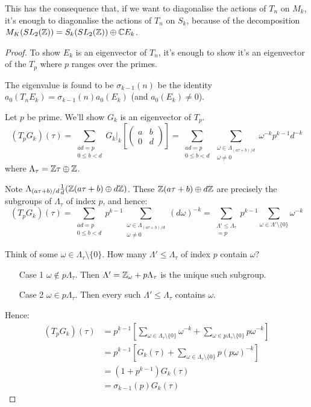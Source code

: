 \documentclass[10pt,a4paper]{article}
\begin{document}
This has the consequence that, if we want to diagonalise the actions of $T_n$ on $M_k$, it's enough to diagonalise the actions of $T_n$ on $S_k$, because of the decomposition $M_K(SL_2(\mathbb{Z})) = S_k(SL_2(\mathbb{Z})) \oplus \mathbb{C} E_k$.
\begin{proof}
  To show $E_k$ is an eigenvector of $T_n$, it's enough to show it's an eigenvector of the $T_p$ where $p$ ranges over the primes.

  The eigenvalue is found to be $\sigma_{k-1}(n)$ be the identity $a_0(T_n E_k) = \sigma_{k-1}(n)a_0(E_k)$ (and $a_0(E_k) \neq 0$).

  Let $p$ be prime. We'll show $G_k$ is an eigenvector of $T_p$.
  \[(T_pG_k)(\tau) = \sum_{\substack{ad = p\\ 0\leq b < d}} G_k|_k\left[\begin{pmatrix}a&b\\0&d\end{pmatrix}\right] = \sum_{\substack{ad = p\\ 0\leq b < d}}\sum_{\substack{\omega \in \Lambda_{(a\tau+b)/d}\\ \omega \neq 0}}\omega^{-k}p^{k-1}d^{-k}\]
  where $\Lambda_\tau = \mathbb{Z}\tau \oplus \mathbb{Z}$.

  Note $\Lambda_{(a\tau+b)/d} \frac{1}{d}(\mathbb{Z}(a\tau+b)\oplus d\mathbb{Z})$. These $\mathbb{Z}(a\tau+b)\oplus d\mathbb{Z}$ are precisely the subgroups of $\Lambda_\tau$ of index $p$, and hence:
  \[(T_p G_k)(\tau) = \sum_{\substack{ad = p\\ 0\leq b < d}} p^{k-1} \sum_{\substack{\omega \in \Lambda_{(a\tau+b)/d}\\\omega \neq 0}} (d\omega)^{-k} = \sum_{\substack{\Lambda' \leq \Lambda_\tau \\ [\Lambda_\tau:\Lambda']=p }} p^{k-1} \sum_{\omega \in \Lambda'\setminus\{0\}} \omega^{-k}\]

  Think of some $\omega \in \Lambda_\tau \setminus \{0\}$. How many $\Lambda' \leq \Lambda_\tau$ of index $p$ contain $\omega$?
  \begin{enumerate}
    \item[Case 1] $\omega \notin p\Lambda_\tau$. Then $\Lambda' = \mathbb{Z}_\omega +p\Lambda_\tau$ is the unique such subgroup.
    \item[Case 2] $\omega \in p\Lambda_\tau$. Then every such $\Lambda'\leq \Lambda_\tau$ contains $\omega$.
  \end{enumerate}
  Hence:
  \begin{align*}
    (T_pG_k)(\tau) &= p^{k-1}\left[\sum_{\omega \in \Lambda_\tau\setminus\{0\}} \omega^{-k} + \sum_{\omega \in p\Lambda_\tau \setminus\{0\}} p\omega^{-k} \right] \\
    &= p^{k-1}\left[G_k(\tau) + \sum_{\omega \in \Lambda_\tau \setminus\{0\}} p(p\omega)^{-k}\right]\\
    &= (1+p^{k-1})G_k(\tau)\\
    &= \sigma_{k-1}(p)G_k(\tau)
  \end{align*}
\end{proof}
\end{document}

